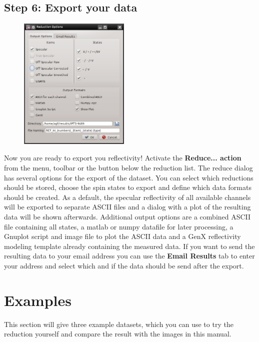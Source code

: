 \subsection{Step 6: Export your data}
  \label{sec:export}
    \begin{figure}
    \centering
     \includegraphics[width=150pt]{screenshots/reduced.png}
    \end{figure}
    Now you are ready to export you reflectivity! 
    Activate the \textbf{Reduce... action}  from the menu, toolbar or the button below the reduction list.
    The reduce dialog has several options for the export of the dataset.
    You can select which reductions should be stored, choose the spin states to export and define which data formats should be created.
    As a default, the specular reflectivity of all available channels will be exported to separate ASCII files and a dialog with a plot of the resulting data will be shown afterwards.
    Additional output options are a combined ASCII file containing all states, a matlab or numpy datafile for later processing, a Gnuplot script and image file to plot the ASCII data and a GenX reflectivity modeling template already containing the measured data.
    If you want to send the resulting data to your email address you can use the \textbf{Email Results} tab to enter your address and select which and if the data should be send after the export.
    
    

\section{Examples}
  This section will give three example datasets, which you can use to try the reduction yourself and compare the result with the images in this manual.
  
